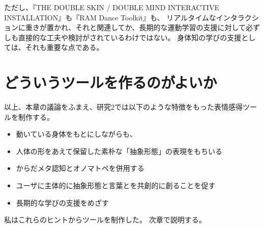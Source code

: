 ただし、『THE DOUBLE SKIN / DOUBLE MIND INTERACTIVE INSTALLATION』\cite{fdilialaoui_et_al:2015}も『RAM Dance Toolkit』\cite{konno_et_al:2016}も、
リアルタイムなインタラクションに重きが置かれ、それと関連してか、長期的な運動学習の支援に対して必ずしも直接的な工夫や検討がされているわけではない。
身体知の学びの支援としては、それも重要な点である。

\section{どういうツールを作るのがよいか}
以上、本章の議論をふまえ、研究2では以下のような特徴をもった表情感得ツールを制作する。          
\begin{itemize}
  \item 動いている身体をもとにしながらも、
  \item 人体の形をあえて保留した素朴な「抽象形態」の表現をもちいる
  \item からだメタ認知とオノマトペを併用する
  \item ユーザに主体的に抽象形態と言葉とを共創的に創ることを促す
  \item 長期的な学びの支援をめざす
\end{itemize}
私はこれらのヒントからツールを制作した。
次章で説明する。











